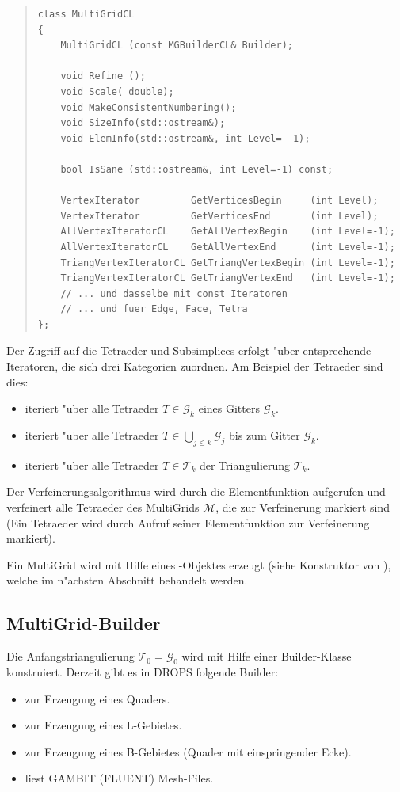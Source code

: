 \documentclass[11pt,a4paper]{article}
\newenvironment{Code}{\begin{quote}\scriptsize}{\end{quote}}
\begin{document}
\begin{Code}
\begin{verbatim}
class MultiGridCL
{
    MultiGridCL (const MGBuilderCL& Builder);

    void Refine ();
    void Scale( double);
    void MakeConsistentNumbering();
    void SizeInfo(std::ostream&);
    void ElemInfo(std::ostream&, int Level= -1);

    bool IsSane (std::ostream&, int Level=-1) const;

    VertexIterator         GetVerticesBegin     (int Level);
    VertexIterator         GetVerticesEnd       (int Level);
    AllVertexIteratorCL    GetAllVertexBegin    (int Level=-1);
    AllVertexIteratorCL    GetAllVertexEnd      (int Level=-1);
    TriangVertexIteratorCL GetTriangVertexBegin (int Level=-1);
    TriangVertexIteratorCL GetTriangVertexEnd   (int Level=-1);
    // ... und dasselbe mit const_Iteratoren
    // ... und fuer Edge, Face, Tetra
};
\end{verbatim}
\end{Code}

Der Zugriff auf die Tetraeder und Subsimplices erfolgt "uber entsprechende
Iteratoren, die sich drei Kategorien zuordnen. Am Beispiel der Tetraeder sind
dies:
\begin{itemize}
    \item {} iteriert "uber alle Tetraeder $T\in\mathcal G_k$
    eines Gitters $\mathcal G_k$.
    \item {} iteriert "uber alle Tetraeder
    $T\in\bigcup_{j\leq k}{\mathcal G_j}$ bis zum Gitter $\mathcal G_k$.
    \item {} iteriert "uber alle Tetraeder
    $T\in\mathcal T_k$ der Triangulierung $\mathcal T_k$.
\end{itemize}

Der Verfeinerungsalgorithmus wird durch die Elementfunktion 
aufgerufen und verfeinert alle Tetraeder des MultiGrids $\mathcal M$, die zur
Verfeinerung markiert sind (Ein Tetraeder wird durch Aufruf seiner
Elementfunktion  zur Verfeinerung markiert).

Ein MultiGrid wird mit Hilfe eines -Objektes erzeugt (siehe
Konstruktor von ), welche im n"achsten Abschnitt behandelt
werden.

\subsection{MultiGrid-Builder}
Die Anfangstriangulierung $\mathcal T_0=\mathcal G_0$ wird mit Hilfe einer
Builder-Klasse konstruiert. Derzeit gibt es in DROPS folgende Builder:
\begin{itemize}
    \item {} zur Erzeugung eines Quaders.
    \item {} zur Erzeugung eines L-Gebietes.
    \item {} zur Erzeugung eines B-Gebietes (Quader mit
    einspringender Ecke).
    \item {} liest GAMBIT (FLUENT) Mesh-Files.
\end{itemize}
\end{document}
